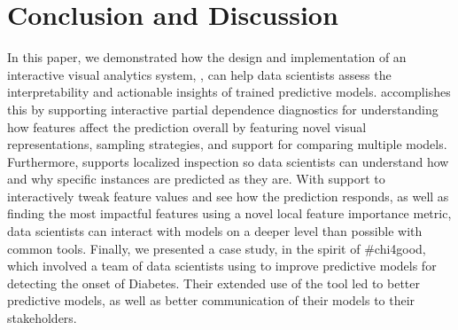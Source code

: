 
\section{Conclusion and Discussion}

In this paper, we demonstrated how the design and implementation of an interactive visual analytics system,
\prospector, can help data scientists assess the interpretability and actionable insights of trained predictive models. \prospector accomplishes this by supporting interactive partial dependence diagnostics for understanding how features affect the prediction overall by featuring novel visual representations, sampling strategies, and support for comparing multiple models.  Furthermore, \prospector supports localized inspection so data scientists can understand how and why specific instances are predicted as they are.  With support to interactively tweak feature values and see how the prediction responds, as well as finding the most impactful features using a novel local feature importance metric, data scientists can interact with models on a deeper level than possible with common tools.  Finally, we presented a case study, in the spirit of \#chi4good, which involved a team of data scientists using \prospector  to improve predictive models for detecting the onset of Diabetes.  Their extended use of the tool led to better predictive models, as well as better communication of their models to their stakeholders.



